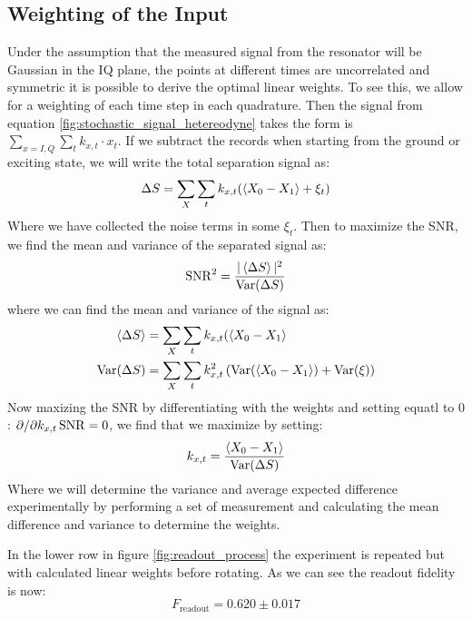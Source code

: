 \subsection{Weighting of the Input}
Under the assumption that the measured signal from the resonator will be Gaussian in the IQ plane, the points at different times are uncorrelated and symmetric   it is possible to derive the optimal linear weights. To see this, we allow for a weighting of each time step in each quadrature. Then the signal from equation \ref{fig:stochastic_signal_hetereodyne} takes the form is $\sum_{x = I, Q}\sum_t k_{x, t} \cdot x_t$. If we subtract the records when starting from the ground or exciting state, we will write the total separation signal as:
\begin{equation}
    \Delta S = \sum_X \sum_t k_{x, t} (\expval{X_0 - X_1} + \xi_t)
\end{equation}
Where we have collected the noise terms in some $\xi_t$. Then to maximize the SNR, we find the mean and variance of the separated signal as:
\begin{equation}
    \operatorname{SNR}^2 = \frac{|\expval{\Delta S}|^2}{\operatorname{Var}(\Delta S)} 
\end{equation}
where we can find the mean and variance of the signal as:
\begin{align}
    \expval{\Delta S} &= \sum_X \sum_t k_{x, t} (\expval{X_0 - X_1} \\
    \operatorname{Var}(\Delta S) &= \sum_X \sum_t k_{x, t}^2 \left( \operatorname{Var}(\expval{X_0 - X_1}) + \operatorname{Var}(\xi) \right)
\end{align}
Now maxizing the SNR by differentiating with the weights and setting equatl to $0$: $\partial / \partial k_{x, t} \operatorname{SNR} = 0$, we find that we maximize by setting:
\begin{equation}
    k_{x, t} = \frac{\expval{X_0 - X_1}}{\operatorname{Var}(\Delta S)}
\end{equation}
Where we will determine the variance and average expected difference experimentally by performing a set of measurement and calculating the mean difference and variance to determine the weights. 

In the lower row in figure \ref{fig:readout_process} the experiment is repeated but with calculated linear weights before rotating. As we can see the readout fidelity is now:
\begin{equation}
    F_{\text{readout}} = 0.620 \pm 0.017
\end{equation}

